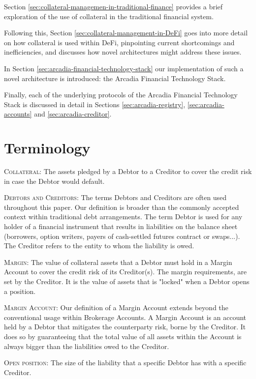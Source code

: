 \documentclass[sigconf,nonacm]{acmart}
\begin{document}
Section \ref{sec:collateral-managemen-in-traditional-finance} provides a brief exploration of the use of collateral in the traditional financial system.

Following this, Section \ref{sec:collateral-management-in-DeFi} goes into more detail on how collateral is used within DeFi,
pinpointing current shortcomings and inefficiencies, and discusses how novel architectures might address these issues.

In Section \ref{sec:arcadia-financial-technology-stack} our implementation of such a novel architecture is introduced:
the Arcadia Financial Technology Stack.

Finally, each of the underlying protocols of the Arcadia Financial Technology Stack is discussed in detail 
in Sections \ref{sec:arcadia-registry}, \ref{sec:arcadia-accounts} and \ref{sec:arcadia-creditor}.

\section{Terminology}
\label{sec:terminology}
\textsc{Collateral:} The assets pledged by a Debtor to a Creditor to cover the credit risk in case the Debtor would default.

\textsc{Debtors and Creditors:} The terms Debtors and Creditors are often used throughout this paper.
Our definition is broader than the commonly accepted context within traditional debt arrangements.
The term Debtor is used for any holder of a financial instrument that results in liabilities on the balance sheet
(borrowers, option writers, payers of cash-settled futures contract or swaps...).
The Creditor refers to the entity to whom the liability is owed.

\textsc{Margin:} The value of collateral assets that a Debtor must hold in a Margin Account to cover the credit risk of its Creditor(s).
The margin requirements, are set by the Creditor.
It is the value of assets that is "locked" when a Debtor opens a position.

\textsc{Margin Account:} Our definition of a Margin Account extends beyond the conventional usage within Brokerage Accounts.
A Margin Account is an account held by a Debtor that mitigates the counterparty risk, borne by the Creditor.
It does so by guaranteeing that the total value of all assets within the Account is always bigger than the liabilities owed to the Creditor.

\textsc{Open position:} The size of the liability that a specific Debtor has with a specific Creditor.
\end{document}
